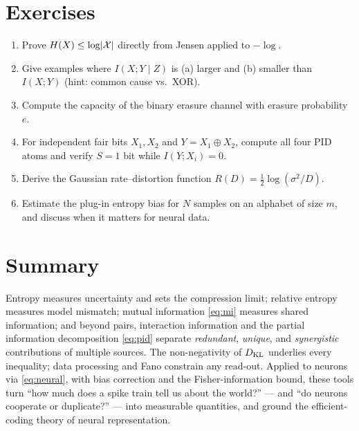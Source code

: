 \documentclass[11pt]{article}
\begin{document}
\section*{Exercises}
\begin{enumerate}[leftmargin=1.6em]
  \item Prove $H(X)\le\log\lvert\mathcal X\rvert$ directly from Jensen applied to $-\log$.
  \item Give examples where $I(X;Y\mid Z)$ is (a) larger and (b) smaller than $I(X;Y)$ (hint:
  common cause vs.\ XOR).
  \item Compute the capacity of the binary erasure channel with erasure probability $e$.
  \item For independent fair bits $X_1,X_2$ and $Y=X_1\oplus X_2$, compute all four PID atoms and
  verify $S=1$ bit while $I(Y;X_i)=0$.
  \item Derive the Gaussian rate--distortion function $R(D)=\tfrac12\log(\sigma^2/D)$.
  \item Estimate the plug-in entropy bias for $N$ samples on an alphabet of size $m$, and discuss
  when it matters for neural data.
\end{enumerate}

\section{Summary}
Entropy measures uncertainty and sets the compression limit; relative entropy measures model
mismatch; mutual information \eqref{eq:mi} measures shared information; and beyond pairs,
interaction information and the partial information decomposition \eqref{eq:pid} separate
\emph{redundant}, \emph{unique}, and \emph{synergistic} contributions of multiple sources. The
non-negativity of $D_{\mathrm{KL}}$ underlies every inequality; data processing and Fano constrain any
read-out. Applied to neurons via \eqref{eq:neural}, with bias correction and the Fisher-information
bound, these tools turn ``how much does a spike train tell us about the world?'' --- and ``do
neurons cooperate or duplicate?'' --- into measurable quantities, and ground the efficient-coding
theory of neural representation.
\end{document}
